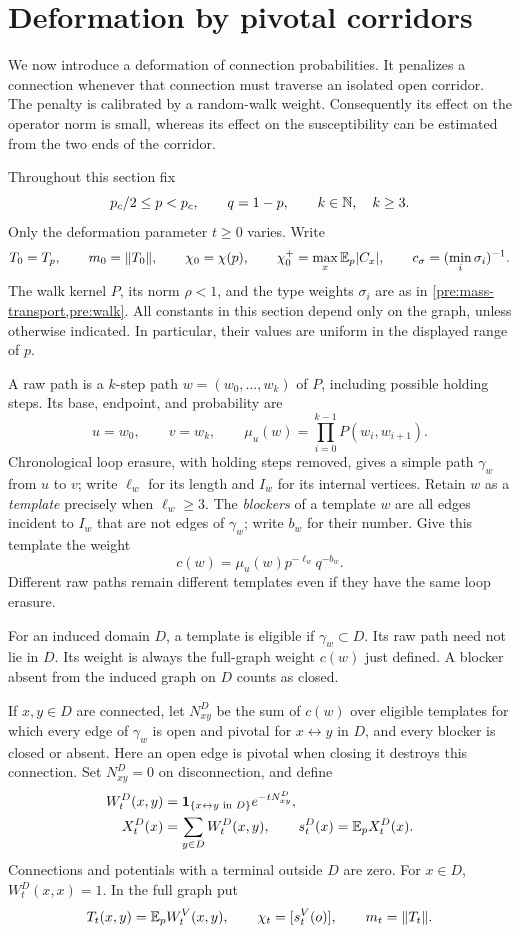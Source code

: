 \section{Deformation by pivotal corridors}\label{def:section}

We now introduce a deformation of connection probabilities.  It penalizes a
connection whenever that connection must traverse an isolated open corridor.
The penalty is calibrated by a random-walk weight.  Consequently its effect
on the operator norm is small, whereas its effect on the susceptibility can
be estimated from the two ends of the corridor.

Throughout this section fix
\[
 {p_c}/2\le p<{p_c},\qquad q=1-p,\qquad k\in\mathbb N,\quad k\ge3.
\]
Only the deformation parameter $t\ge0$ varies.  Write
\[
 T_0=T_p,\qquad m_0=\lVert T_0\rVert,\qquad
 \chi_0=\chi(p),\qquad \chi_0^+=\max_x\mathbb E_p|C_x|,
 \qquad c_\sigma=(\min_i\sigma_i)^{-1}.
\]
The walk kernel $P$, its norm $\rho<1$, and the type weights $\sigma_i$
are as in \cref{pre:mass-transport,pre:walk}.  All constants in this section depend only on
the graph, unless otherwise indicated.  In particular, their values are
uniform in the displayed range of $p$.

\begin{definition}\label{def:templates}
A raw path is a $k$-step path $w=(w_0,\ldots,w_k)$ of $P$, including possible
holding steps.  Its base, endpoint, and probability are
\[
 u=w_0,\qquad v=w_k,\qquad
 \mu_u(w)=\prod_{i=0}^{k-1}P(w_i,w_{i+1}).
\]
Chronological loop erasure, with holding steps removed, gives a simple path
$\gamma_w$ from $u$ to $v$; write $\ell_w$ for its length and $I_w$ for its
internal vertices.  Retain $w$ as a \emph{template} precisely when
$\ell_w\ge3$.  The \emph{blockers} of a template $w$ are all edges incident to
$I_w$ that are not edges of $\gamma_w$; write $b_w$ for their number.  Give
this template the weight
\[
 c(w)=\mu_u(w)p^{-\ell_w}q^{-b_w}.
\]
Different raw paths remain different templates even if they have the same
loop erasure.

For an induced domain $D$, a template is eligible if $\gamma_w\subset D$.
Its raw path need not lie in $D$.  Its weight is always the full-graph weight
$c(w)$ just defined.  A blocker absent from the induced graph on $D$ counts
as closed.

If $x,y\in D$ are connected, let $N^D_{xy}$ be the sum of $c(w)$ over
eligible templates for which every edge of $\gamma_w$ is open and pivotal
for $x\leftrightarrow y$ in $D$, and every blocker is closed or absent.
Here an open edge is pivotal when closing it destroys this connection.
Set $N^D_{xy}=0$ on disconnection, and define
\[
 \begin{split}
 W_t^D(x,y)&=\mathbf 1_{\{x\leftrightarrow y\text{ in }D\}}
                    e^{-tN^D_{xy}},\\
 X_t^D(x)&=\sum_{y\in D}W_t^D(x,y),\qquad
 s_t^D(x)=\mathbb E_p X_t^D(x).
 \end{split}
\]
Connections and potentials with a terminal outside $D$ are zero.
For $x\in D$, $W_t^D(x,x)=1$.  In the full graph put
\[
 T_t(x,y)=\mathbb E_pW_t^V(x,y),\qquad
 \chi_t=[s_t^V(o)],\qquad m_t=\lVert T_t\rVert.
\]
\end{definition}

